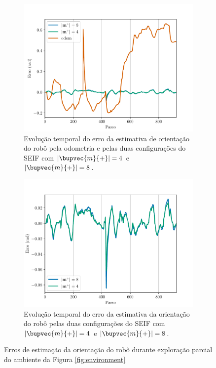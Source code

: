 \begin{figure}
  \centering
  \begin{subfigure}{.75\textwidth}
    \includegraphics[width=\textwidth]{figs/theta-error-odom-seif.pdf} 
    \caption{Evolução temporal do erro da estimativa de orientação do robô pela odometria e pelas duas configurações do SEIF com $\lvert \bupvec{m}{+}\rvert = 4 $ e $\lvert \bupvec{m}{+}\rvert = 8 $.}
    \label{fig:theta-error-odom-and-seifs}
  \end{subfigure}
  \begin{subfigure}{.75\textwidth}
    \includegraphics[width=\textwidth]{figs/theta-error-seifs.pdf} 
    \caption{Evolução temporal do erro da estimativa da orientação do robô pelas duas configurações do SEIF com $\lvert \bupvec{m}{+}\rvert = 4 $ e $\lvert \bupvec{m}{+}\rvert = 8 $.}
    \label{fig:theta-error-seifs}
  \end{subfigure}
  \caption[Erros de estimação de orientação no experimento SEIF vs Odometria]{Erros de estimação da orientação do robô durante exploração parcial do ambiente da Figura \ref{fig:environment}}
  \label{fig:theta-error}
\end{figure}

